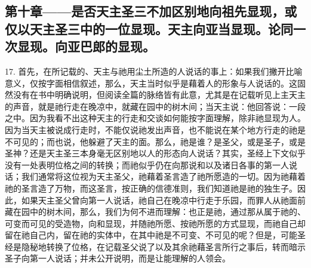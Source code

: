 
\subsection{第十章——是否天主圣三不加区别地向祖先显现，或仅以天主圣三中的一位显现。天主向亚当显现。论同一次显现。向亚巴郎的显现。}

17. 首先，在所记载的、天主与祂用尘土所造的人说话的事上：如果我们撇开比喻意义，仅按字面相信叙述，那么，天主当时似乎是藉着人的形象与人说话的。这固然没有在书中明确说明，但阅读全篇的脉络皆有此意，尤其是在记载听见上主天主的声音，就是祂行走在晚凉中，就藏在园中的树木间；当天主说：他回答说：一段之中。因为我看不出这种天主的行走和交谈如何能按字面理解，除非祂显现为人。因为当天主被说成行走时，不能仅说祂发出声音，也不能说在某个地方行走的祂是不可见的；而也说，他躲避了天主的面。那么，祂是谁？是圣父，或是圣子，或是圣神？还是天主圣三本身毫无区别地以人的形态向人说话？其实，圣经上下文似乎没有一处表明位格之间的转换；而祂似乎仍在向那说和以及诸日各事的第一人说话；我们通常将这位视为天主圣父，祂藉着圣言造了祂所愿造的一切。因为祂藉着祂的圣言造了万物，而这圣言，按正确的信德准则，我们知道祂是祂的独生子。因此，如果天主圣父曾向第一人说话，祂自己在晚凉中行走于乐园，而罪人从祂面前藏在园中的树木间，那么，我们为何不进而理解：也正是祂，通过那从属于祂的、可变而可见的受造物，向和显现，并随祂所愿、按祂所愿的方式显现，而祂自己却留在祂自己内，留在祂的实体中，在其中祂是不可变、不可见的呢？但是，可能圣经是隐秘地转换了位格，在记载圣父说了以及其余祂藉圣言所行之事后，转而暗示圣子向第一人说话；并未公开说明，而是让能理解的人领会。\par

